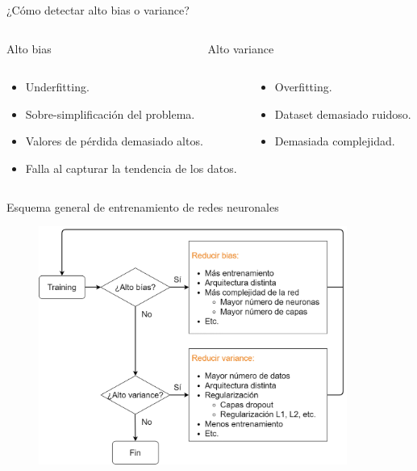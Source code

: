 \begin{frame}{¿Cómo detectar alto bias o variance?}

\begin{columns}[c]
\begin{column}{0.49\textwidth}
\Large \alert{Alto bias}
\end{column}

\begin{column}{0.49\textwidth}
\Large \alert{Alto variance}
\end{column}
\end{columns}

\begin{columns}[c]
\begin{column}{0.49\textwidth}
\begin{itemize}
    \item Underfitting.
    \item Sobre-simplificación del problema.
    \item Valores de pérdida demasiado altos.
    \item Falla al capturar la tendencia de los datos.
\end{itemize} 
\end{column}

\begin{column}{0.49\textwidth}
\begin{itemize}
    \item Overfitting.
    \item Dataset demasiado ruidoso.
    \item Demasiada complejidad.
\end{itemize} 
\end{column}
\end{columns}
\end{frame}

\begin{frame}{Esquema general de entrenamiento de redes neuronales}
\begin{figure}
\centering
    \includegraphics[width=0.9\textwidth]{Slides/figures/Tema 3/NNTrainingScheme.png}
\end{figure}
\end{frame}

